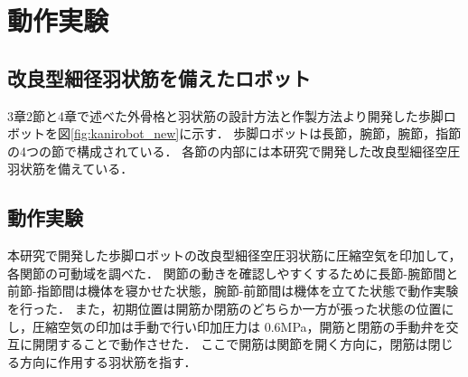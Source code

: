 \newpage
\section{動作実験}
\subsection{改良型細径羽状筋を備えたロボット}
3章2節と4章で述べた外骨格と羽状筋の設計方法と作製方法より開発した歩脚ロボットを図\ref{fig:kanirobot_new}に示す．
歩脚ロボットは長節，腕節，腕節，指節の4つの節で構成されている．
各節の内部には本研究で開発した改良型細径空圧羽状筋を備えている．
\subsection{動作実験}
本研究で開発した歩脚ロボットの改良型細径空圧羽状筋に圧縮空気を印加して，各関節の可動域を調べた．
関節の動きを確認しやすくするために長節-腕節間と前節-指節間は機体を寝かせた状態，腕節-前節間は機体を立てた状態で動作実験を行った．
また，初期位置は開筋か閉筋のどちらか一方が張った状態の位置にし，圧縮空気の印加は手動で行い印加圧力は 0.6MPa，開筋と閉筋の手動弁を交互に開閉することで動作させた．
ここで開筋は関節を開く方向に，閉筋は閉じる方向に作用する羽状筋を指す．

